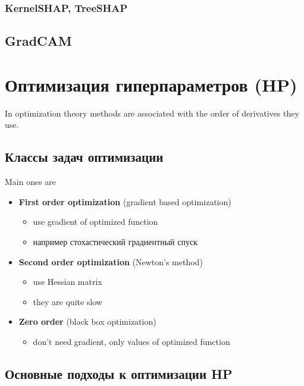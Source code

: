\documentclass[a4paper, 14pt]{article}
\begin{document}
    \subsubsection{KernelSHAP, TreeSHAP}
    
    \subsection{GradCAM}
    
    \section{Оптимизация гиперпараметров (HP)}
    
    In optimization theory methods are associated with the order of derivatives they use.
    
    \subsection{Классы задач оптимизации}
    
    Main ones are
    
    \begin{itemize}
        \item \textbf{First order optimization} (gradient based optimization)
        \begin{itemize}
            \item use gradient of optimized function
            \item например стохастический градиентный спуск
        \end{itemize}
        \item \textbf{Second order optimization} (Newton's method)
        \begin{itemize}
            \item use Hessian matrix
            \item they are quite slow
        \end{itemize}
        \item \textbf{Zero order} (black box optimization)
        \begin{itemize}
            \item don't need gradient, only values of optimized function
        \end{itemize}
    \end{itemize}
    
    \subsection{Основные подходы к оптимизации HP}
    
\end{document}
